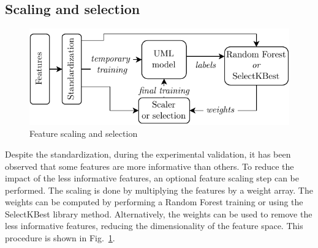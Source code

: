 \subsection{Scaling and selection}
\begin{figure}
    \includegraphics[width=\linewidth]{images/Feat_scaling.pdf}
    \caption{Feature scaling and selection}
    \label{fig:feature_scaling}
\end{figure}
Despite the standardization, during the experimental validation, it has been observed that some features are more informative than others. To reduce the impact of the less informative features, an optional feature scaling step can be performed. The scaling is done by multiplying the features by a weight array. The weights can be computed by performing a Random Forest training or using the SelectKBest library method. Alternatively, the weights can be used to remove the less informative features, reducing the dimensionality of the feature space. This procedure is shown in Fig.~\ref{fig:feature_scaling}.